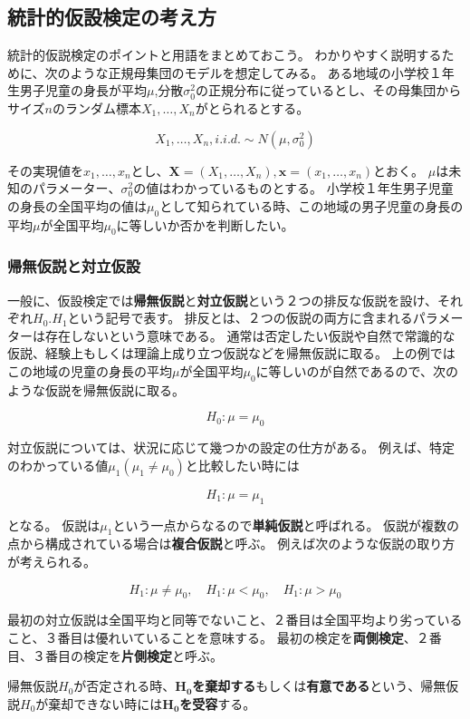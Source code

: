 \documentclass{article}
\begin{document}
\subsection{統計的仮設検定の考え方}

統計的仮説検定のポイントと用語をまとめておこう。
わかりやすく説明するために、次のような正規母集団のモデルを想定してみる。
ある地域の小学校１年生男子児童の身長が平均$\mu$,分散$\sigma_0^2$の正規分布に従っているとし、その母集団からサイズ$n$のランダム標本$X_1, \ldots,X_n$がとられるとする。

$$
X_1, \ldots, X_n, i.i.d. \sim N(\mu, \sigma_0^2)
$$

その実現値を$x_1, \ldots, x_n$とし、$\bm{X}=(X_1, \ldots, X_n), \bm{x}=(x_1, \ldots,x_n)$とおく。
$\mu$は未知のパラメーター、$\sigma_0^2$の値はわかっているものとする。
小学校１年生男子児童の身長の全国平均の値は$\mu_0$として知られている時、この地域の男子児童の身長の平均$\mu$が全国平均$\mu_0$に等しいか否かを判断したい。


\subsubsection{帰無仮説と対立仮設}

一般に、仮設検定では\textbf{帰無仮説}と\textbf{対立仮説}という２つの排反な仮説を設け、それぞれ$H_0.H_1$という記号で表す。
排反とは、２つの仮説の両方に含まれるパラメーターは存在しないという意味である。
通常は否定したい仮説や自然で常識的な仮説、経験上もしくは理論上成り立つ仮説などを帰無仮説に取る。
上の例ではこの地域の児童の身長の平均$\mu$が全国平均$\mu_0$に等しいのが自然であるので、次のような仮説を帰無仮説に取る。


$$
H_0: \mu = \mu_0
$$

対立仮説については、状況に応じて幾つかの設定の仕方がある。
例えば、特定のわかっている値$\mu_1(\mu_1 \neq \mu_0)$と比較したい時には

$$
H_1: \mu = \mu_1
$$

となる。
仮説は$\mu_1$という一点からなるので\textbf{単純仮説}と呼ばれる。
仮説が複数の点から構成されている場合は\textbf{複合仮説}と呼ぶ。
例えば次のような仮説の取り方が考えられる。

$$
H_1: \mu \neq \mu_0, \quad H_1: \mu < \mu_0, \quad H_1: \mu > \mu_0
$$

最初の対立仮説は全国平均と同等でないこと、２番目は全国平均より劣っていること、３番目は優れいていることを意味する。
最初の検定を\textbf{両側検定}、２番目、３番目の検定を\textbf{片側検定}と呼ぶ。

帰無仮説$H_0$が否定される時、\textbf{$\bm{H_0}$を棄却する}もしくは\textbf{有意である}という、帰無仮説$H_0$が棄却できない時には\textbf{$\bm{H_0}$を受容}する。
\end{document}
